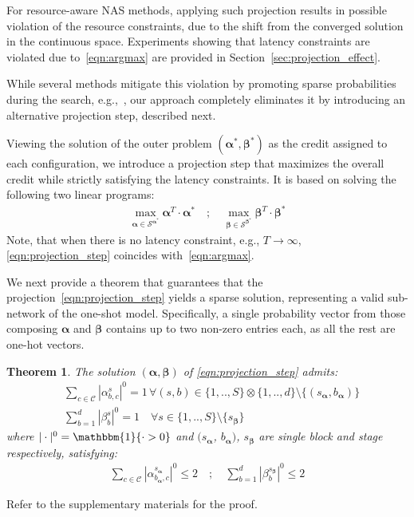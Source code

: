 \documentclass[dvipsnames,table,xcdraw]{article}
\newtheorem{theo}{Theorem}[section]
\newcommand{\balpha}{\bm{\alpha}}
\newcommand{\bbeta}{\bm{\beta}}
\begin{document}
For resource-aware NAS methods, applying such projection results in possible violation of the resource constraints, due to the shift from the converged solution in the continuous space. Experiments showing that latency constraints are violated due to~\eqref{eqn:argmax} are provided in Section~\ref{sec:projection_effect}.

While several methods mitigate this violation by promoting sparse probabilities during the search, e.g.,~\cite{noy2020asap, nayman2019xnas}, 
our approach completely eliminates it by introducing an alternative projection step, described next.

Viewing the solution of the outer problem $(\balpha^*, \bbeta^*)$ as the credit assigned to each configuration,
we introduce a projection step that maximizes the overall credit while strictly satisfying the latency constraints. It is based on solving the following two linear programs:
\begin{align}\label{eqn:projection_step}
  \max_{\balpha\in\mathcal{S}^{\balpha^*}} \balpha^T\cdot \balpha^*
  \quad; \quad
  \max_{\bbeta\in\mathcal{S}^{\bbeta^*}} \bbeta^T\cdot\bbeta^*
\end{align}
Note, that when there is no latency constraint, e.g., $T\rightarrow\infty$, \eqref{eqn:projection_step} coincides with~\eqref{eqn:argmax}.

We next provide a theorem that guarantees that the projection~\eqref{eqn:projection_step} yields a sparse solution, representing a valid sub-network of the one-shot model. Specifically, a single probability vector from those composing $\balpha$ and $\bbeta$ contains up to two non-zero entries each, as all the rest are one-hot vectors. 
\begin{theo}
\label{thm:one_hot_sol}
The solution $(\balpha, \bbeta)$ of \eqref{eqn:projection_step} admits:
\begin{align*}
  &\sum_{c\in\mathcal{C}}|\alpha^s_{b,c}|^0 = 1 \,\forall 
  (s, b)\in\{1,..,S\}\otimes \{1,..,d\}\setminus{\{(s_{\balpha}, b_{\balpha})\}}
  \\
  &\sum_{b=1}^d|\beta^s_b|^0 = 1 \quad \forall s\in\{1,..,S\}\setminus{\{s_{\bbeta}\}}
\end{align*}
where $|\cdot|^0=\mathbbm{1}\{\cdot>0\}$ and $(s_{\balpha}$, $b_{\balpha})$, $s_{\bbeta}$  are single block and stage respectively, satisfying:
\begin{align}\label{eqn:dense_remiders}
  \sum_{c\in\mathcal{C}}|\alpha^{s_{\balpha}}_{{b_{\balpha}},c}|^0 \leq 2
  \quad ; \quad 
  \sum_{b=1}^d|\beta^{s_{\bbeta}}_b|^0 \leq 2
\end{align}
\end{theo}
Refer to the supplementary materials for the proof.
\end{document}
